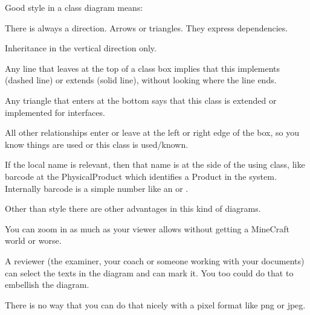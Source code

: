 Good style in a class diagram means:
\begin{Itemize}
\item There is always a direction. Arrows or triangles. They express dependencies.
\item Inheritance in the vertical direction only.
  \begin{Itemize}
    \item Any line that leaves at the top of a class box implies that this
      implements (dashed line) or extends (solid line), without looking where the line ends.
    \item Any triangle that enters at the bottom says that this class is extended or implemented for interfaces.
  \end{Itemize}
  \item All other relationships enter or leave at the left or right edge of the box, so you know things are used
  or this class is used/known.
  \begin{Itemize}
  \item If the local name is relevant, then that name is at the side of the using class, like barcode at the PhysicalProduct which identifies a Product in the system. Internally barcode is a simple number like an  or .
  \end{Itemize}
\end{Itemize}

Other than style there are other advantages in this kind of diagrams.
\begin{Itemize}
\item You can zoom in as much as your viewer allows without getting a MineCraft world or worse.
\item A reviewer (the examiner, your coach or someone working with your documents) can select the texts in the diagram and can mark it. You too could do that to embellish the diagram.
\item There is no way that you can do that nicely with a pixel format like png or jpeg.
\end{Itemize}

